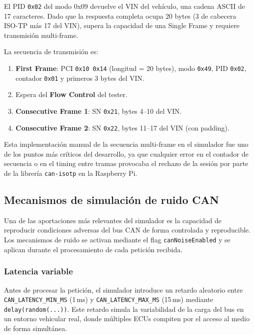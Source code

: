 El PID \texttt{0x02} del modo 0x09 devuelve el VIN del vehículo, una cadena ASCII de 17 caracteres. Dado que la respuesta completa ocupa 20 bytes (3 de cabecera ISO-TP más 17 del VIN), supera la capacidad de una Single Frame y requiere transmisión multi-frame.

La secuencia de transmisión es:
\begin{enumerate}
    \item \textbf{First Frame}: PCI \texttt{0x10 0x14} (longitud = 20 bytes), modo
    \texttt{0x49}, PID \texttt{0x02}, contador \texttt{0x01} y primeros 3 bytes del VIN.
    \item Espera del \textbf{Flow Control} del tester.
    \item \textbf{Consecutive Frame 1}: SN \texttt{0x21}, bytes 4--10 del VIN.
    \item \textbf{Consecutive Frame 2}: SN \texttt{0x22}, bytes 11--17 del VIN
    (con padding).
\end{enumerate}

Esta implementación manual de la secuencia multi-frame en el simulador fue uno de los puntos más críticos del desarrollo, ya que cualquier error en el contador de secuencia o en el timing entre tramas provocaba el rechazo de la sesión por parte de la librería \texttt{can-isotp} en la Raspberry Pi.


\subsection{Mecanismos de simulación de ruido CAN}
\label{sec:ruido_can}

Una de las aportaciones más relevantes del simulador es la capacidad de reproducir condiciones adversas del bus CAN de forma controlada y reproducible. Los mecanismos de ruido se activan mediante el flag \texttt{canNoiseEnabled} y se aplican durante el procesamiento de cada petición recibida.

\subsubsection{Latencia variable}

Antes de procesar la petición, el simulador introduce un retardo aleatorio entre \texttt{CAN\_LATENCY\_MIN\_MS} (1\,ms) y \texttt{CAN\_LATENCY\_MAX\_MS} (15\,ms) mediante \texttt{delay(random(...))}. Este retardo simula la variabilidad de la carga del bus en un entorno vehicular real, donde múltiples ECUs compiten por el acceso al medio de forma simultánea.

